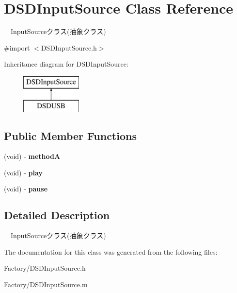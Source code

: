 \hypertarget{interface_d_s_d_input_source}{\section{D\-S\-D\-Input\-Source Class Reference}
\label{interface_d_s_d_input_source}
}


　\-Input\-Sourceクラス(抽象クラス)  




{\ttfamily \#import $<$D\-S\-D\-Input\-Source.\-h$>$}

Inheritance diagram for D\-S\-D\-Input\-Source\-:\begin{figure}[H]
\begin{center}
\leavevmode
\includegraphics[height=2.000000cm]{interface_d_s_d_input_source}
\end{center}
\end{figure}
\subsection*{Public Member Functions}
\begin{DoxyCompactItemize}
\item 
\hypertarget{interface_d_s_d_input_source_aaf22b57bf8db74cb4bafe00c5044530b}{(void) -\/ {\bfseries method\-A}}\label{interface_d_s_d_input_source_aaf22b57bf8db74cb4bafe00c5044530b}

\item 
\hypertarget{interface_d_s_d_input_source_a5418543a3e3bc84fff1d70306c1943fb}{(void) -\/ {\bfseries play}}\label{interface_d_s_d_input_source_a5418543a3e3bc84fff1d70306c1943fb}

\item 
\hypertarget{interface_d_s_d_input_source_a99d30f4e2eab180514695b8e93ff67d1}{(void) -\/ {\bfseries pause}}\label{interface_d_s_d_input_source_a99d30f4e2eab180514695b8e93ff67d1}

\end{DoxyCompactItemize}


\subsection{Detailed Description}
　\-Input\-Sourceクラス(抽象クラス) 

The documentation for this class was generated from the following files\-:\begin{DoxyCompactItemize}
\item 
Factory/D\-S\-D\-Input\-Source.\-h\item 
Factory/D\-S\-D\-Input\-Source.\-m\end{DoxyCompactItemize}
